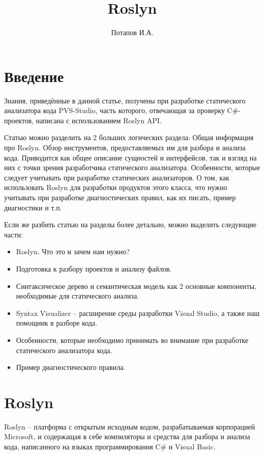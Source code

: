 \documentclass{article}
\begin{document}
\title{Roslyn}
\author{Потапов И.А.}
\date{}
\maketitle
\newpage

\section{Введение}
Знания, приведённые в данной статье, получены при разработке статического анализатора кода PVS-Studio, часть которого, отвечающая за проверку C#-проектов, написана с использованием Roslyn API.

Статью можно разделить на 2 больших логических раздела:
Общая информация про Roslyn. Обзор инструментов, предоставляемых им для разбора и анализа кода. Приводится как общее описание сущностей и интерфейсов, так и взгляд на них с точки зрения разработчика статического анализатора.
Особенности, которые следует учитывать при разработке статических анализаторов. О том, как использовать Roslyn для разработки продуктов этого класса, что нужно учитывать при разработке диагностических правил, как их писать, пример диагностики и т.п.


Если же разбить статью на разделы более детально, можно выделить следующие части:
\begin{itemize}
 \item Roslyn. Что это и зачем нам нужно?
 \item Подготовка к разбору проектов и анализу файлов.
 \item Синтаксическое дерево и семантическая модель как 2 основные компоненты, необходимые для статического анализа.
 \item Syntax Visualizer – расширение среды разработки Visual Studio, а также наш помощник в разборе кода.
 \item Особенности, которые необходимо принимать во внимание при разработке статического анализатора кода.
 \item Пример диагностического правила.
\end{itemize}

\section{Roslyn}
Roslyn – платформа с открытым исходным кодом, разрабатываемая корпорацией Microsoft, и содержащая в себе компиляторы и средства для разбора и анализа кода, написанного на языках программирования C# и Visual Basic.
\end{document}
